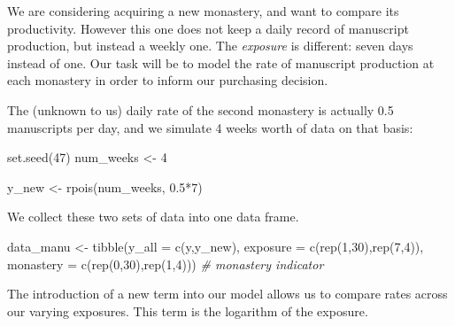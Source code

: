 \documentclass[
]{book}
\newenvironment{Shaded}{\begin{snugshade}}{\end{snugshade}}
\newcommand{\AttributeTok}[1]{\textcolor[rgb]{0.77,0.63,0.00}{#1}}
\newcommand{\CommentTok}[1]{\textcolor[rgb]{0.56,0.35,0.01}{\textit{#1}}}
\newcommand{\DecValTok}[1]{\textcolor[rgb]{0.00,0.00,0.81}{#1}}
\newcommand{\FloatTok}[1]{\textcolor[rgb]{0.00,0.00,0.81}{#1}}
\newcommand{\FunctionTok}[1]{\textcolor[rgb]{0.00,0.00,0.00}{#1}}
\newcommand{\NormalTok}[1]{#1}
\newcommand{\OtherTok}[1]{\textcolor[rgb]{0.56,0.35,0.01}{#1}}
\newcommand{\SpecialCharTok}[1]{\textcolor[rgb]{0.00,0.00,0.00}{#1}}
\begin{document}
We are considering acquiring a new monastery, and want to compare its productivity. However this one does not keep a daily record of manuscript production, but instead a weekly one. The \emph{exposure} is different: seven days instead of one. Our task will be to model the rate of manuscript production at each monastery in order to inform our purchasing decision.

The (unknown to us) daily rate of the second monastery is actually 0.5 manuscripts per day, and we simulate 4 weeks worth of data on that basis:

\begin{Shaded}
\begin{Highlighting}[]
\FunctionTok{set.seed}\NormalTok{(}\DecValTok{47}\NormalTok{)}
\NormalTok{num\_weeks }\OtherTok{\textless{}{-}} \DecValTok{4}

\NormalTok{y\_new }\OtherTok{\textless{}{-}} \FunctionTok{rpois}\NormalTok{(num\_weeks, }\FloatTok{0.5}\SpecialCharTok{*}\DecValTok{7}\NormalTok{)}
\end{Highlighting}
\end{Shaded}

We collect these two sets of data into one data frame.

\begin{Shaded}
\begin{Highlighting}[]
\NormalTok{data\_manu }\OtherTok{\textless{}{-}} \FunctionTok{tibble}\NormalTok{(}\AttributeTok{y\_all =} \FunctionTok{c}\NormalTok{(y,y\_new),}
                    \AttributeTok{exposure =} \FunctionTok{c}\NormalTok{(}\FunctionTok{rep}\NormalTok{(}\DecValTok{1}\NormalTok{,}\DecValTok{30}\NormalTok{),}\FunctionTok{rep}\NormalTok{(}\DecValTok{7}\NormalTok{,}\DecValTok{4}\NormalTok{)),}
                    \AttributeTok{monastery =} \FunctionTok{c}\NormalTok{(}\FunctionTok{rep}\NormalTok{(}\DecValTok{0}\NormalTok{,}\DecValTok{30}\NormalTok{),}\FunctionTok{rep}\NormalTok{(}\DecValTok{1}\NormalTok{,}\DecValTok{4}\NormalTok{))) }\CommentTok{\# monastery indicator}
\end{Highlighting}
\end{Shaded}

The introduction of a new term into our model allows us to compare rates across our varying exposures. This term is the logarithm of the exposure.
\end{document}
